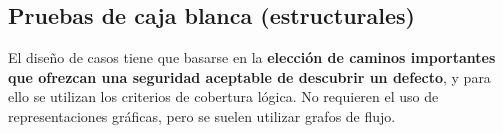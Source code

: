 




\subsection{Pruebas de caja blanca (estructurales)} 
El diseño de casos tiene que basarse en la \textbf{elección de caminos importantes que ofrezcan una seguridad aceptable de descubrir un defecto}, y para ello se utilizan los criterios de cobertura lógica. No requieren el uso de representaciones gráficas, pero se suelen utilizar grafos de flujo.

